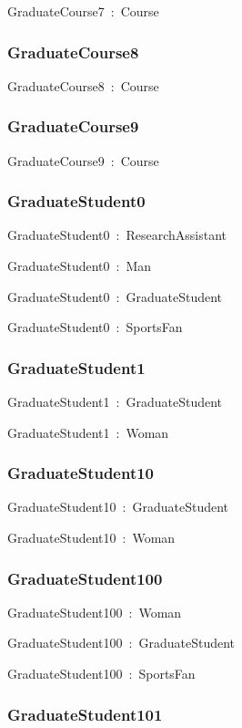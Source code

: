 \documentclass{article}
\begin{document}
GraduateCourse7~:~Course

\subsubsection*{GraduateCourse8}

GraduateCourse8~:~Course

\subsubsection*{GraduateCourse9}

GraduateCourse9~:~Course

\subsubsection*{GraduateStudent0}

GraduateStudent0~:~ResearchAssistant

GraduateStudent0~:~Man

GraduateStudent0~:~GraduateStudent

GraduateStudent0~:~SportsFan

\subsubsection*{GraduateStudent1}

GraduateStudent1~:~GraduateStudent

GraduateStudent1~:~Woman

\subsubsection*{GraduateStudent10}

GraduateStudent10~:~GraduateStudent

GraduateStudent10~:~Woman

\subsubsection*{GraduateStudent100}

GraduateStudent100~:~Woman

GraduateStudent100~:~GraduateStudent

GraduateStudent100~:~SportsFan

\subsubsection*{GraduateStudent101}
\end{document}
